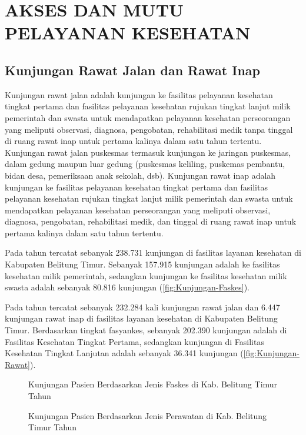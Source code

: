 \section{AKSES DAN MUTU PELAYANAN KESEHATAN}
\subsection{Kunjungan Rawat Jalan dan Rawat Inap}
Kunjungan rawat jalan adalah kunjungan ke fasilitas pelayanan kesehatan tingkat pertama dan fasilitas pelayanan kesehatan rujukan tingkat lanjut milik pemerintah dan swasta untuk mendapatkan pelayanan kesehatan perseorangan yang meliputi observasi, diagnosa, pengobatan, rehabilitasi medik tanpa tinggal di ruang rawat inap untuk pertama kalinya dalam satu tahun tertentu. Kunjungan rawat jalan puskesmas termasuk kunjungan ke jaringan puskesmas, dalam gedung maupun luar gedung (puskesmas keliling, puskemas pembantu, bidan desa, pemeriksaan anak sekolah, dsb).
Kunjungan rawat inap adalah kunjungan ke fasilitas pelayanan kesehatan tingkat pertama dan fasilitas pelayanan kesehatan rujukan tingkat lanjut milik pemerintah dan swasta untuk mendapatkan pelayanan kesehatan perseorangan yang meliputi observasi, diagnosa, pengobatan, rehabilitasi medik, dan tinggal di ruang rawat inap untuk pertama kalinya dalam satu tahun tertentu.

Pada tahun \tP tercatat sebanyak 238.731 kunjungan di fasilitas layanan kesehatan di Kabupaten Belitung Timur. Sebanyak 157.915 kunjungan adalah ke fasilitas kesehatan milik pemerintah, sedangkan kunjungan ke fasilitas kesehatan milik swasta adalah sebanyak 80.816 kunjungan (\autoref{fig:Kunjungan-Faskes}).

Pada tahun \tP tercatat sebanyak 232.284 kali kunjungan rawat jalan dan 6.447 kunjungan rawat inap di fasilitas layanan kesehatan di Kabupaten Belitung Timur. Berdasarkan tingkat fasyankes, sebanyak 202.390 kunjungan adalah di Fasilitas Kesehatan Tingkat Pertama, sedangkan kunjungan di Fasilitas Kesehatan Tingkat Lanjutan adalah sebanyak 36.341 kunjungan (\autoref{fig:Kunjungan-Rawat}).

\begin{figure}[!htb]
    \centering{}
    \caption{Kunjungan Pasien Berdasarkan Jenis Faskes di Kab. Belitung Timur Tahun \tP}
    \label{fig:Kunjungan-Faskes}
\end{figure}

\begin{figure}[!htb]
    \centering{}
    \caption{Kunjungan Pasien Berdasarkan Jenis Perawatan di Kab. Belitung Timur Tahun \tP}
    \label{fig:Kunjungan-Rawat}
\end{figure}

